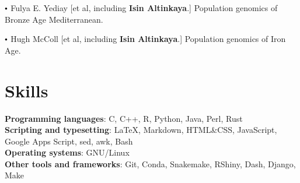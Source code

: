 \documentclass[letterpaper,10.5pt]{article}
\newcommand\sbullet[1][.5]{\mathbin{\vcenter{\hbox{\scalebox{#1}{$\bullet$}}}}}
\begin{document}
$\sbullet[.6]$ \hspace{0.74cm}  Fulya E. Yediay [et al, including \textbf{Isin Altinkaya}.]  Population genomics of Bronze Age Mediterranean. \\
\smallskip

$\sbullet[.6]$ \hspace{0.74cm}  Hugh McColl [et al, including \textbf{Isin Altinkaya}.]  Population genomics of Iron Age. \\



\section{Skills}
\textbf{Programming languages}: C, C++, R, Python, Java, Perl, Rust \\
\textbf{Scripting and typesetting}: \LaTeX, Markdown, HTML\&CSS, JavaScript, Google Apps Script, sed, awk, Bash \\
\textbf{Operating systems}: GNU/Linux \\
\textbf{Other tools and frameworks}: Git, Conda, Snakemake, RShiny, Dash, Django, Make \\



\end{document}

